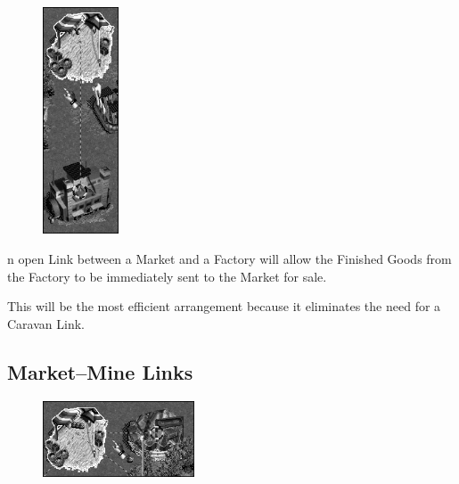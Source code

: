 \begin{figure}
	\vspace{-20pt}
	\begin{center}
		\includegraphics[width=0.2\textwidth]{Ilink_factorymarket}
	\end{center}
	\vspace{-20pt}
\end{figure}

n open Link between a Market and a Factory will allow the Finished Goods from the Factory to be immediately sent to the Market for sale.

This will be the most efficient arrangement because it eliminates the need for a Caravan Link.

\subsection{Market–Mine Links}


\begin{figure}
	\vspace{-20pt}
	\begin{center}
		\includegraphics[width=0.4\textwidth]{Ilink_marketmine}
	\end{center}
	\vspace{-10pt}
\end{figure}

